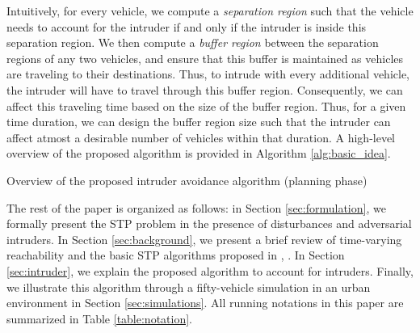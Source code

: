 Intuitively, for every vehicle, we compute a \textit{separation region} such that the vehicle needs to account for the intruder if and only if the intruder is inside this separation region. We then compute a \textit{buffer region} between the separation regions of any two vehicles, and ensure that this buffer is maintained as vehicles are traveling to their destinations. Thus, to intrude with every additional vehicle, the intruder will have to travel through this buffer region. Consequently, we can affect this traveling time based on the size of the buffer region. Thus, for a given time duration, we can design the buffer region size such that the intruder can affect atmost a desirable number of vehicles within that duration. A high-level overview of the proposed algorithm is provided in Algorithm \ref{alg:basic_idea}.    
%
\begin{algorithm}[tb]
	\DontPrintSemicolon
	\caption{Overview of the proposed intruder avoidance algorithm (planning phase)}
	\label{alg:basic_idea}
\end{algorithm}
%

The rest of the paper is organized as follows: in Section \ref{sec:formulation}, we formally present the STP problem in the presence of disturbances and adversarial intruders. In Section \ref{sec:background}, we present a brief review of time-varying reachability and the basic STP algorithms proposed in \cite{Chen15c}, \cite{Bansal2017}. In Section \ref{sec:intruder}, we explain the proposed algorithm to account for intruders. Finally, we illustrate this algorithm through a fifty-vehicle simulation in an urban environment in Section \ref{sec:simulations}. All running notations in this paper are summarized in Table \ref{table:notation}.